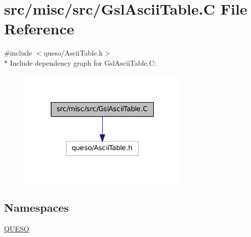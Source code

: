 \hypertarget{_gsl_ascii_table_8_c}{\section{src/misc/src/\-Gsl\-Ascii\-Table.C File Reference}
\label{_gsl_ascii_table_8_c}
}
{\ttfamily \#include $<$queso/\-Ascii\-Table.\-h$>$}\\*
Include dependency graph for Gsl\-Ascii\-Table.\-C\-:
\nopagebreak
\begin{figure}[H]
\begin{center}
\leavevmode
\includegraphics[width=232pt]{_gsl_ascii_table_8_c__incl}
\end{center}
\end{figure}
\subsection*{Namespaces}
\begin{DoxyCompactItemize}
\item 
\hyperlink{namespace_q_u_e_s_o}{Q\-U\-E\-S\-O}
\end{DoxyCompactItemize}

